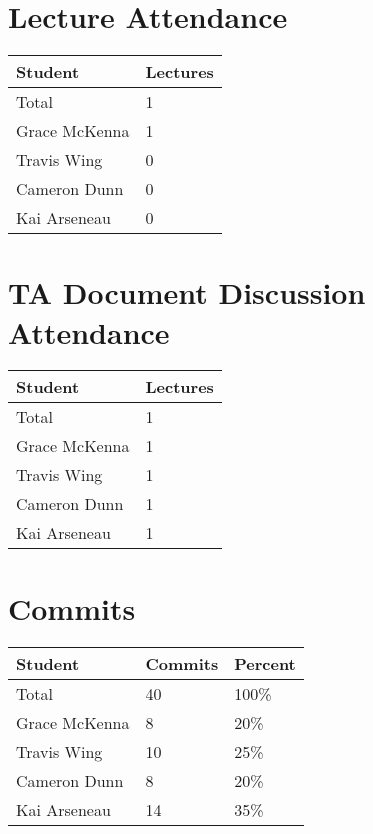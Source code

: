 \documentclass{article}
\begin{document}
\section{Lecture Attendance}


\begin{table}[H]
\centering
\begin{tabular}{ll}
\toprule
\textbf{Student} & \textbf{Lectures}\\
\midrule
Total & 1\\
Grace McKenna & 1\\
Travis Wing & 0\\
Cameron Dunn & 0\\
Kai Arseneau & 0\\
\bottomrule
\end{tabular}
\end{table}


\section{TA Document Discussion Attendance}


\begin{table}[H]
\centering
\begin{tabular}{ll}
\toprule
\textbf{Student} & \textbf{Lectures}\\
\midrule
Total & 1\\
Grace McKenna & 1\\
Travis Wing & 1\\
Cameron Dunn & 1\\
Kai Arseneau & 1\\
\bottomrule
\end{tabular}
\end{table}


\section{Commits}

\begin{table}[H]
\centering
\begin{tabular}{lll}
\toprule
\textbf{Student} & \textbf{Commits} & \textbf{Percent}\\
\midrule
Total & 40 & 100\% \\
Grace McKenna & 8 & 20\% \\
Travis Wing & 10 & 25\% \\
Cameron Dunn & 8 & 20\% \\
Kai Arseneau & 14 & 35\% \\
\bottomrule
\end{tabular}
\end{table}
\end{document}
